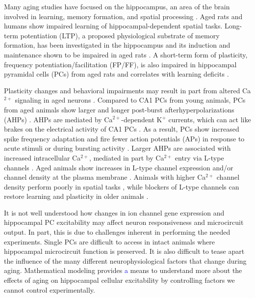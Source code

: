\documentclass[10pt,letterpaper]{article}
\newcommand{\Ca}{Ca$^{2+}$}
\newcommand{\K}{K$^{+}$}
\newcommand{\edit}[1]{\textcolor{blue}{#1}}
\begin{document}
Many aging studies have focused on the hippocampus, an area of the brain involved in learning, memory formation, and spatial processing
\cite{oh2010learning,rosenzweig2003impact}. Aged rats \cite{barnes1985age,gage1984spatial,caprioli1991spatial} and humans \cite{wilkniss1997age} show impaired learning of hippocampal-dependent spatial tasks. Long-term potentiation (LTP), a proposed physiological substrate of memory formation, has been investigated in the hippocampus and its induction and maintenance shown to be impaired in aged rats
\cite{deupree1993age,rosenzweig1997role}. A short-term form of plasticity, frequency potentiation/facilitation (FP/FF), is also impaired in hippocampal pyramidal cells (PCs) from aged rats and correlates with learning deficits
\cite{landfield1978impaired}.

Plasticity changes and behavioral impairments may result in part from altered Ca$^{2+}$ signaling
in aged neurons
\cite{oh2010learning,rosenzweig2003impact}. Compared to CA1 PCs from young animals, PCs from aged animals show larger and longer post-burst afterhyperpolarizations (AHPs)
\cite{landfield1984prolonged,gant2009action,power2002age}. AHPs
are mediated by {\Ca}-dependent {\K} currents, which can act like brakes on the electrical activity of CA1 PCs
\cite{alger1980epileptiform,hotson1980calcium}. As a result, PCs show increased spike frequency adaptation and fire fewer action potentials (APs) in response to acute stimuli or during bursting activity 
\cite{gant2006early,moyer1992nimodipine,tombaugh2005slow}. Larger AHPs are associated with increased intracellular Ca$^{2+}$, mediated in part by {\Ca} entry via L-type channels
\cite{campbell1996aging,moyer1992nimodipine,power2002age,thibault2001elevated}. Aged
animals show increases in L-type channel expression and/or channel
density at the plasma membrane
\cite{herman1998up,thibault1996increase,veng2002regionally,nunez2014surface}.
Animals with higher {\Ca} channel density perform poorly in spatial
tasks  \cite{thibault1996increase}, while blockers of L-type channels can
restore learning and plasticity in older animals
\cite{norris1998reversal,sandin1990aging}.

It is not well understood how changes in ion channel gene expression and hippocampal PC excitability may affect neuron responsiveness and microcircuit output. In part, this is due
to challenges inherent in performing the needed experiments. Single PCs are difficult
to access in intact animals where hippocampal microcircuit function is
preserved. It is also difficult to tease apart the influence of the many different neurophysiological factors that change during aging. Mathematical modeling provides \edit{a} means to understand more about the effects of aging on hippocampal cellular excitability by controlling factors we cannot control experimentally.
\end{document}
